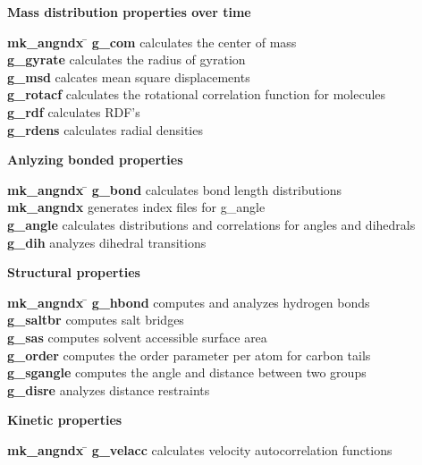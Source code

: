\begin{description}
\item {\large\bf Mass distribution properties over time}
\begin{tabbing}
{\bf mk\_angndx} \= \kill
{\bf g\_com} \> calculates the center of mass \\
{\bf g\_gyrate} \> calculates the radius of gyration \\
{\bf g\_msd} \> calcates mean square displacements \\
{\bf g\_rotacf} \> calculates the rotational correlation function for molecules \\
{\bf g\_rdf} \> calculates RDF's \\
{\bf g\_rdens} \> calculates radial densities \\
\end{tabbing}

\item {\large\bf Anlyzing bonded properties}
\begin{tabbing}
{\bf mk\_angndx} \= \kill
{\bf g\_bond} \> calculates bond length distributions \\
{\bf mk\_angndx} \> generates index files for g\_angle \\
{\bf g\_angle} \> calculates distributions and correlations for angles and dihedrals \\
{\bf g\_dih} \> analyzes dihedral transitions \\
\end{tabbing}

\item {\large\bf Structural properties}
\begin{tabbing}
{\bf mk\_angndx} \= \kill
{\bf g\_hbond} \> computes and analyzes hydrogen bonds \\
{\bf g\_saltbr} \> computes salt bridges \\
{\bf g\_sas} \> computes solvent accessible surface area \\
{\bf g\_order} \> computes the order parameter per atom for carbon tails \\
{\bf g\_sgangle} \> computes the angle and distance between two groups \\
{\bf g\_disre} \> analyzes distance restraints \\
\end{tabbing}

\item {\large\bf Kinetic properties}
\begin{tabbing}
{\bf mk\_angndx} \= \kill
{\bf g\_velacc} \> calculates velocity autocorrelation functions \\
\end{tabbing}


\end{description}
